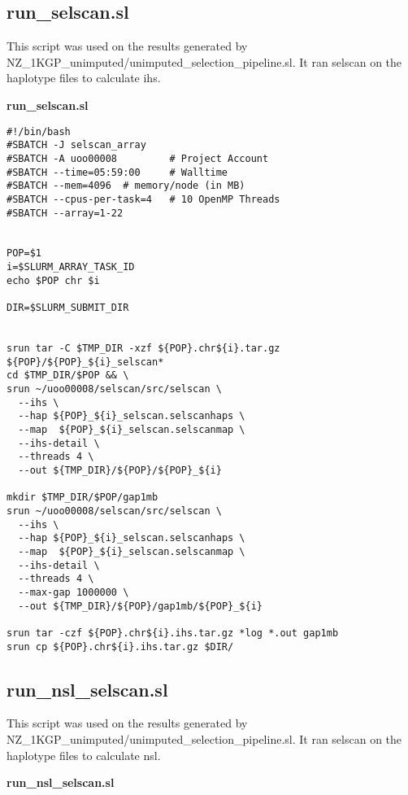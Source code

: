 \documentclass[]{report}
\begin{document}
\subsection{run\_selscan.sl}\label{run_selscan.sl}

This script was used on the results generated by
NZ\_1KGP\_unimputed/unimputed\_selection\_pipeline.sl. It ran selscan on
the haplotype files to calculate \gls{ihs}.

\textbf{run\_selscan.sl}

\begin{verbatim}
#!/bin/bash
#SBATCH -J selscan_array
#SBATCH -A uoo00008         # Project Account
#SBATCH --time=05:59:00     # Walltime
#SBATCH --mem=4096  # memory/node (in MB)
#SBATCH --cpus-per-task=4   # 10 OpenMP Threads
#SBATCH --array=1-22


POP=$1
i=$SLURM_ARRAY_TASK_ID
echo $POP chr $i

DIR=$SLURM_SUBMIT_DIR


srun tar -C $TMP_DIR -xzf ${POP}.chr${i}.tar.gz ${POP}/${POP}_${i}_selscan* 
cd $TMP_DIR/$POP && \
srun ~/uoo00008/selscan/src/selscan \
  --ihs \
  --hap ${POP}_${i}_selscan.selscanhaps \
  --map  ${POP}_${i}_selscan.selscanmap \
  --ihs-detail \
  --threads 4 \
  --out ${TMP_DIR}/${POP}/${POP}_${i}
  
mkdir $TMP_DIR/$POP/gap1mb
srun ~/uoo00008/selscan/src/selscan \
  --ihs \
  --hap ${POP}_${i}_selscan.selscanhaps \
  --map  ${POP}_${i}_selscan.selscanmap \
  --ihs-detail \
  --threads 4 \
  --max-gap 1000000 \
  --out ${TMP_DIR}/${POP}/gap1mb/${POP}_${i}

srun tar -czf ${POP}.chr${i}.ihs.tar.gz *log *.out gap1mb
srun cp ${POP}.chr${i}.ihs.tar.gz $DIR/
\end{verbatim}

\subsection{run\_nsl\_selscan.sl}\label{run_nsl_selscan.sl}

This script was used on the results generated by
NZ\_1KGP\_unimputed/unimputed\_selection\_pipeline.sl. It ran selscan on
the haplotype files to calculate \gls{nsl}.

\textbf{run\_nsl\_selscan.sl}
\end{document}
